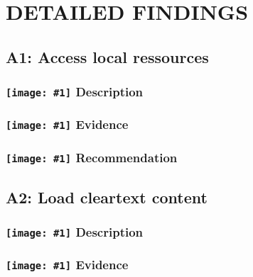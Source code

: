 \documentclass[12p]{article}
\newcommand{\icon}[1]{\texttt{[image: \#1]}}
\begin{document}
\section{DETAILED FINDINGS}
\subsection{A1: Access local ressources}
\subsubsection*{\protect\icon{/home/miki/Documents/GITHUB/AndroidPermissions/python/vulns/report_icons/basic_sheet.png} Description}

\subsubsection*{\protect\icon{/home/miki/Documents/GITHUB/AndroidPermissions/python/vulns/report_icons/basic_magnifier.png} Evidence}

\subsubsection*{\protect\icon{/home/miki/Documents/GITHUB/AndroidPermissions/python/vulns/report_icons/basic_todo.png} Recommendation}

\subsection{A2: Load cleartext content}
\subsubsection*{\protect\icon{/home/miki/Documents/GITHUB/AndroidPermissions/python/vulns/report_icons/basic_sheet.png} Description}

\subsubsection*{\protect\icon{/home/miki/Documents/GITHUB/AndroidPermissions/python/vulns/report_icons/basic_magnifier.png} Evidence}
\end{document}
